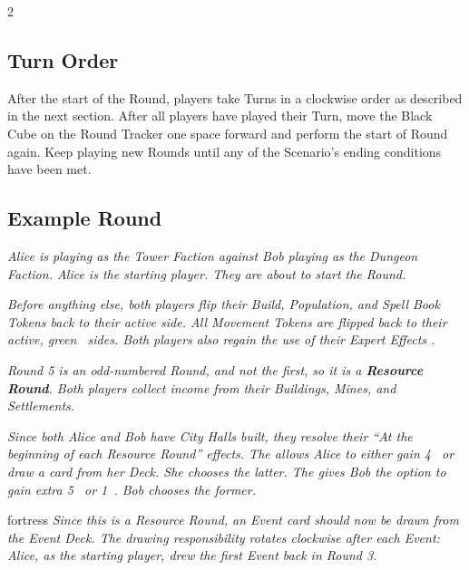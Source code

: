 \begin{multicols*}{2}
\subsection*{Turn Order}

After the start of the Round, players take Turns in a clockwise order as described in the next section.
After all players have played their Turn, move the Black Cube on the Round Tracker one space forward and perform the start of Round again.
Keep playing new Rounds until any of the Scenario's ending conditions have been met.


\subsection*{Example Round}

\textit{Alice is playing as the Tower Faction against Bob playing as the Dungeon Faction.
Alice is the starting player.
They are about to start the  Round.
}\par

\textit{Before anything else, both players flip their Build, Population, and Spell Book Tokens back to their active side.
All Movement Tokens are flipped back to their active, green~ sides.
Both players also regain the use of their Expert Effects .}\par

\textit{Round 5 is an odd-numbered Round, and not the first, so it is a \textbf{Resource Round}.
Both players collect income from their Buildings, Mines, and Settlements.}\par

\textit{Since both Alice and Bob have City Halls built, they resolve their ``At the beginning of each Resource Round'' effects.
The  allows Alice to either gain 4~ or draw a card from her Deck.
She chooses the latter.
The  gives Bob the option to gain extra 5~ or 1~.
Bob chooses the former.
}\par


\begin{expansion}{fortress}
\textit{Since this is a Resource Round, an Event card should now be drawn from the Event Deck.
  The drawing responsibility rotates clockwise after each Event: Alice, as the starting player, drew the first Event back in Round 3.}\par


\end{expansion}
\end{multicols*}
